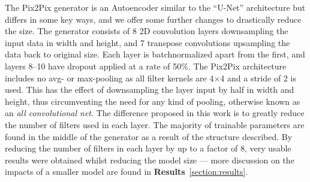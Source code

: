 \documentclass{article}
\begin{document}
The Pix2Pix generator is an Autoencoder similar to the ``U-Net'' architecture\cite{1505.04597} but differs in some key ways, and we offer some further changes to drastically reduce the size. The generator consists of 8 2D convolution layers downsampling the input data in width and height, and 7 transpose convolutions upsampling the data back to original size. Each layer is batchnormalized\cite{1502.03167} apart from the first, and layers 8--10 have dropout\cite{JMLR:v15:srivastava14a} applied at a rate of 50\%. The Pix2Pix architecture includes no avg- or max-pooling as all filter kernels are 4$\times$4 and a stride of 2 is used. This has the effect of downsampling the layer input by half in width and height, thus circumventing the need for any kind of pooling, otherwise known as an \textit{all convolutional net}\cite{1412.6806}. The difference proposed in this work is to greatly reduce the number of filters used in each layer. The majority of trainable parameters are found in the middle of the generator as a result of the structure described. By reducing the number of filters in each layer by up to a factor of 8, very usable results were obtained whilst reducing the model size --- more discussion on the impacts of a smaller model are found in \textbf{Results}~\ref{section:results}.
\end{document}
